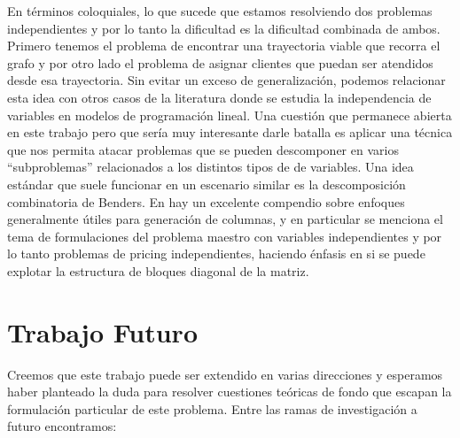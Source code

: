 En términos coloquiales, lo que sucede que estamos resolviendo dos problemas independientes y por lo tanto la dificultad es la dificultad combinada de ambos. Primero tenemos el problema de encontrar una trayectoria viable que recorra el grafo y por otro lado el problema de asignar clientes que puedan ser atendidos desde esa trayectoria. Sin evitar un exceso de generalización, podemos relacionar esta idea con otros casos de la literatura donde se estudia la independencia de variables en modelos de programación lineal. Una cuestión que permanece abierta en este trabajo pero que sería muy interesante darle batalla es aplicar una técnica que nos permita atacar problemas que se pueden descomponer en varios ``subproblemas'' relacionados a los distintos tipos de de variables. Una idea estándar que suele funcionar en un escenario similar es la descomposición combinatoria de Benders. En \cite{desrosiers2005primer} hay un excelente compendio sobre enfoques generalmente útiles para generación de columnas, y en particular se menciona el tema de formulaciones del problema maestro con variables independientes y por lo tanto problemas de pricing independientes, haciendo énfasis en si se puede explotar la estructura de bloques diagonal de la matriz. 


\section{Trabajo Futuro}

Creemos que este trabajo puede ser extendido en varias direcciones y esperamos haber planteado la duda para resolver cuestiones teóricas de fondo que escapan la formulación particular de este problema. Entre las ramas de investigación a futuro encontramos:

